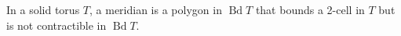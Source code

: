 In a solid torus $T$, a meridian is a polygon in $\operatorname{Bd} T$ that bounds a 2-cell in $T$ but is not contractible in $\operatorname{Bd} T$.
